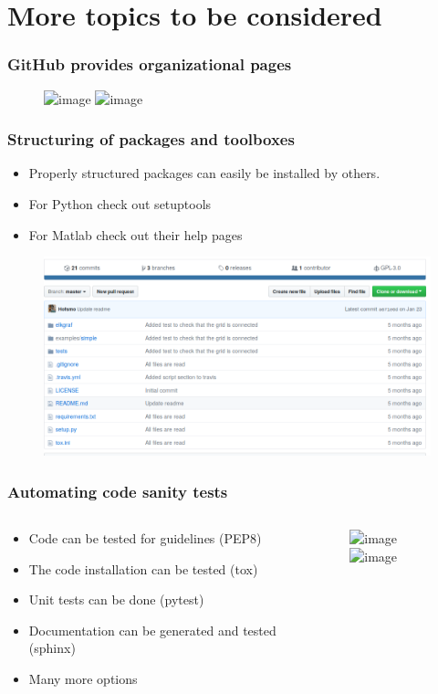 \section[More topics]{More topics to be considered}
\begin{frame}
	\frametitle{GitHub provides organizational pages}
	\begin{figure}
		\includegraphics<1>[width=\textwidth]{./pictures/kth.png}
		\includegraphics<2>[width=\textwidth]{./pictures/alsetlab.png}
	\end{figure}
\end{frame}
\begin{frame}
	\frametitle{Structuring of packages and toolboxes}
		\begin{itemize}
			\item Properly structured packages can easily be installed by others.
			\item For Python check out setuptools
			\item For Matlab check out their help pages
		\end{itemize}
	\begin{figure}
		\includegraphics[width=\textwidth]{./pictures/structure.png}
	\end{figure}
\end{frame}
\begin{frame}
	\frametitle{Automating code sanity tests}
	\begin{columns}
		\begin{column}{0.5\textwidth}
			\begin{itemize}
				\item Code can be tested for guidelines (PEP8)
				\item The code installation can be tested (tox)
				\item Unit tests can be done (pytest)
				\item Documentation can be generated and tested (sphinx)
				\item Many more options
			\end{itemize}
		\end{column}
		\begin{column}{0.5\textwidth}
			\begin{figure}
				\includegraphics<1,2,3>[width=\textwidth]{./pictures/travis.png}
				\includegraphics<4,5>[width=\textwidth]{./pictures/pandapower.png}
			\end{figure}
		\end{column}
	\end{columns}
\end{frame}
